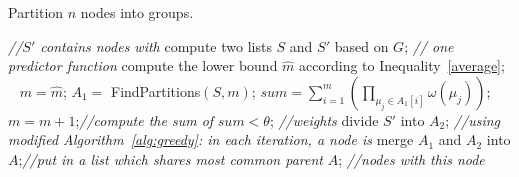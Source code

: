 \documentclass[runningheads,a4paper]{llncs}
\begin{document}

\begin{algorithm}[!t]
\caption{Partition $n$ nodes into groups.}
\label{alg:partition}
\begin{algorithmic}[1]
\hfill{\it //$S'$ contains nodes with}
	\State compute two lists $S$ and $S'$ based on $G$; \hfill{\it // one predictor function}
	\State compute the lower bound $\hat{m}$ according to Inequality~\eqref{average}; ~ $m=\hat{m}$;%
	\label{alg-line:seperate}
	\Repeat
	\State $A_1=$ {\sc FindPartitions}$(S,m)$;
	\State $sum= \sum_{i=1}^{m}\left(\prod_{\mu_j\in A_1[i]}\omega(\mu_j)\right)$; ~~$m=m+1$;\hfill{\it //compute the sum of}%
	\Until $sum <\theta$; \hfill{\it //weights}
	\State divide $S'$ into $A_2$; \hfill{\it //using modified Algorithm~\ref{alg:greedy}: in each iteration, a node is}
	\label{alg-line:one}	
	\State merge $A_1$ and $A_2$ into $A$;\hfill{\it //put in a list which shares most common parent}
	\State \Return $A$; \hfill{\it //nodes with this node}
\EndProcedure
\end{algorithmic}
\end{algorithm}


\end{document}

